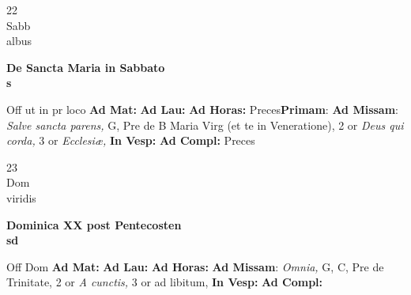 \documentclass[10pt, openany]{book}
\begin{document}
        \begin{center}
            \begin{minipage}{3.5in}
                \vspace{2em}
                \begin{minipage}{0.5in}
                    {\Huge 22} \\
                    {\normalsize Sabb} \\
                    {\normalsize albus}
                \end{minipage}
                \begin{minipage}{3.0in}
                    \textbf{ \large De Sancta Maria in Sabbato \\
                    \textnormal{\normalsize s}} \\ 
                \end{minipage}
                \begin{justify}Off ut in pr loco
                    \textbf{Ad Mat: }
                    \textbf{Ad Lau: }
                    \textbf{Ad Horas: }Preces\textbf{Primam}: \textbf{Ad Missam}: \textit{Salve sancta parens,} G, Pre de B Maria Virg (et te in Veneratione), 2 or \textit{Deus qui corda,} 3 or \textit{Ecclesiæ,}  
                    \textbf{In Vesp: }
                    \textbf{Ad Compl: }Preces
                \end{justify}
            \end{minipage}
        \end{center}
    
        \begin{center}
            \begin{minipage}{3.5in}
                \vspace{2em}
                \begin{minipage}{0.5in}
                    {\Huge 23} \\
                    {\normalsize Dom} \\
                    {\normalsize viridis}
                \end{minipage}
                \begin{minipage}{3.0in}
                    \textbf{ \large Dominica XX post Pentecosten \\
                    \textnormal{\normalsize sd}} \\ 
                \end{minipage}
                \begin{justify}Off Dom
                    \textbf{Ad Mat: }
                    \textbf{Ad Lau: }
                    \textbf{Ad Horas: }\textbf{Ad Missam}: \textit{Omnia,} G, C, Pre de Trinitate, 2 or \textit{A cunctis,} 3 or ad libitum,  
                    \textbf{In Vesp: }
                    \textbf{Ad Compl: }
                \end{justify}
            \end{minipage}
        \end{center}
    
\end{document}

